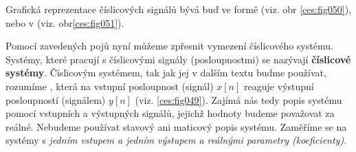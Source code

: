     Grafická reprezentace číslicových signálů bývá buď ve  formě (viz. obr
    \ref{ces:fig050}), nebo v  (viz. obr\ref{ces:fig051}).

  

    Pomocí zavedených pojů nyní můžeme zpřesnit vymezení číslicového systému. Systémy, které pracují
    s číslicovými signály (posloupnostmi) se nazývají \textbf{číslicové systémy}. Číslicovým
    systémem, tak jak jej v dalším textu budme používat, rozumíme , která na
    vstupní posloupnost (signál) \(x[n]\) reaguje výstupní posloupností (signálem) \(y[n]\) (viz.
    \ref{ces:fig049}). Zajímá nás tedy popis systému pomocí vstupních a výstupných signálů, jejichž
    hodnoty budeme považovat za reálné. Nebudeme používat stavový ani maticový popis systému.
    Zaměříme se na systémy s \emph{jedním vstupem a jedním výstupem a reálnými parametry
    (koeficienty)}.
    

